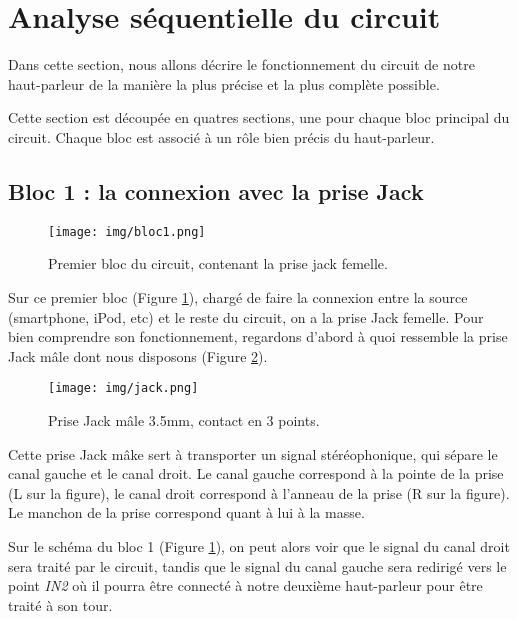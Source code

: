 


\section{Analyse séquentielle du circuit}
Dans cette section, nous allons décrire le fonctionnement du circuit
de notre haut-parleur de la manière la plus précise et la plus complète
possible. 

Cette section est découpée en quatres sections, une pour chaque bloc 
principal du circuit. Chaque bloc est associé à un rôle bien précis du
haut-parleur.

\subsection{Bloc 1 : la connexion avec la prise Jack}

\begin{figure}[h]
	\centering
	\texttt{[image: img/bloc1.png]}
	\caption{Premier bloc du circuit, contenant 
					la prise jack femelle.}
	\label{bloc1}
\end{figure}

Sur ce premier bloc (Figure \ref{bloc1}), chargé de faire la connexion entre la source (smartphone, iPod, etc) et le reste du circuit, on a la prise Jack femelle. Pour bien comprendre son fonctionnement, regardons d'abord à quoi ressemble la prise Jack mâle dont nous disposons (Figure \ref{jack}).

\begin{figure}[h]
	\centering
	\texttt{[image: img/jack.png]}
	\caption{Prise Jack mâle 3.5mm, contact en 3 points.}
	\label{jack}
\end{figure}

Cette prise Jack mâke sert à transporter un signal stéréophonique, qui sépare le canal gauche et le canal droit.
Le canal gauche correspond à la pointe de la prise (L sur la figure), le canal droit correspond à l'anneau de la prise (R sur la figure). Le manchon de la prise correspond quant à lui à la masse.

Sur le schéma du bloc 1 (Figure \ref{bloc1}), on peut alors voir que le signal du canal droit sera traité par le circuit, tandis que le signal du canal gauche sera redirigé vers le point \textit{IN2} où il pourra être connecté à notre deuxième haut-parleur pour être traité à son tour.

